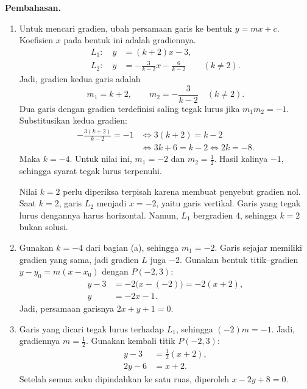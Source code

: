 \documentclass[12pt,a4paper]{article}
\newcommand{\pembahasan}{\par\medskip\textbf{Pembahasan.}\par\smallskip}
\begin{document}
\begin{enumerate}
    \pembahasan
    \begin{enumerate}
      \item Untuk mencari gradien, ubah persamaan garis ke bentuk $y=mx+c$.
        Koefisien $x$ pada bentuk ini adalah gradiennya.
        \begin{align*}
          L_1:\quad y&=(k+2)x-3,\\
          L_2:\quad y&=-\frac{3}{k-2}x-\frac{6}{k-2}\qquad(k\ne2).
        \end{align*}
        Jadi, gradien kedua garis adalah
        \[
          m_1=k+2,\qquad m_2=-\frac{3}{k-2}\quad(k\ne2).
        \]
        Dua garis dengan gradien terdefinisi saling tegak lurus jika $m_1m_2=-1$.
        Substitusikan kedua gradien:
        \begin{align*}
          -\frac{3(k+2)}{k-2}=-1
          &\iff 3(k+2)=k-2\\
          &\iff 3k+6=k-2\iff 2k=-8.
        \end{align*}
        Maka $\boxed{k=-4}$.
        Untuk nilai ini, $m_1=-2$ dan $m_2=\frac12$.
        Hasil kalinya $-1$, sehingga syarat tegak lurus terpenuhi.

        Nilai $k=2$ perlu diperiksa terpisah karena membuat penyebut gradien nol.
        Saat $k=2$, garis $L_2$ menjadi $x=-2$, yaitu garis vertikal.
        Garis yang tegak lurus dengannya harus horizontal.
        Namun, $L_1$ bergradien $4$, sehingga $k=2$ bukan solusi.

      \item Gunakan $k=-4$ dari bagian (a), sehingga $m_1=-2$.
        Garis sejajar memiliki gradien yang sama, jadi gradien $L$ juga $-2$.
        Gunakan bentuk titik--gradien $y-y_0=m(x-x_0)$ dengan $P(-2,3)$:
        \begin{align*}
          y-3&=-2\bigl(x-(-2)\bigr)=-2(x+2),\\
          y&=-2x-1.
        \end{align*}
        Jadi, persamaan garisnya $\boxed{2x+y+1=0}$.

      \item Garis yang dicari tegak lurus terhadap $L_1$, sehingga $(-2)m=-1$.
        Jadi, gradiennya $m=\frac12$.
        Gunakan kembali titik $P(-2,3)$:
        \begin{align*}
          y-3&=\frac12(x+2),\\
          2y-6&=x+2.
        \end{align*}
        Setelah semua suku dipindahkan ke satu ruas, diperoleh
        $\boxed{x-2y+8=0}$.
    \end{enumerate}


\end{enumerate}
\end{document}
